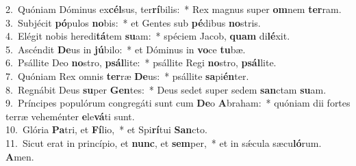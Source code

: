 {2.~}Quóniam Dóminus ex\textbf{cél}sus, ter\textbf{rí}bilis:~* Rex magnus super \textbf{om}nem \textbf{ter}ram.\\
{3.~}Subjécit \textbf{pó}pulos \textbf{no}bis:~* et Gentes sub \textbf{pé}dibus \textbf{no}stris.\\
{4.~}Elégit nobis heredi\textbf{tá}tem \textbf{su}am:~* spéciem Jacob, \textbf{quam} di\textbf{lé}xit.\\
{5.~}Ascéndit \textbf{De}us in \textbf{jú}bilo:~* et Dóminus in \textbf{vo}ce \textbf{tu}bæ.\\
{6.~}Psállite Deo \textbf{no}stro, \textbf{psál}lite:~* psállite Regi \textbf{no}stro, \textbf{psál}lite.\\
{7.~}Quóniam Rex omnis \textbf{ter}ræ \textbf{De}us:~* psállite \textbf{sa}pi\textbf{én}ter.\\
{8.~}Regnábit Deus \textbf{su}per \textbf{Gen}tes:~* Deus sedet super sedem \textbf{san}ctam \textbf{su}am.\\
{9.~}Príncipes populórum congregáti sunt cum \textbf{De}o \textbf{A}braham:~* quóniam dii fortes terræ veheménter \textbf{e}le\textbf{vá}ti sunt.\\
{10.~}Glória \textbf{Pa}tri, et \textbf{Fí}lio,~* et Spi\textbf{rí}tui \textbf{San}cto.\\
{11.~}Sicut erat in princípio, et \textbf{nunc}, et \textbf{sem}per,~* et in sǽcula sæcu\textbf{ló}rum. \textbf{A}men.\\
